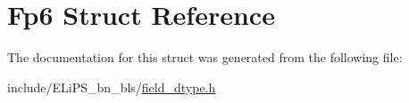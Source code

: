 \hypertarget{struct_fp6}{}\section{Fp6 Struct Reference}
\label{struct_fp6}


The documentation for this struct was generated from the following file\+:\begin{DoxyCompactItemize}
\item 
include/\+E\+Li\+P\+S\+\_\+bn\+\_\+bls/\hyperlink{field__dtype_8h}{field\+\_\+dtype.\+h}\end{DoxyCompactItemize}
